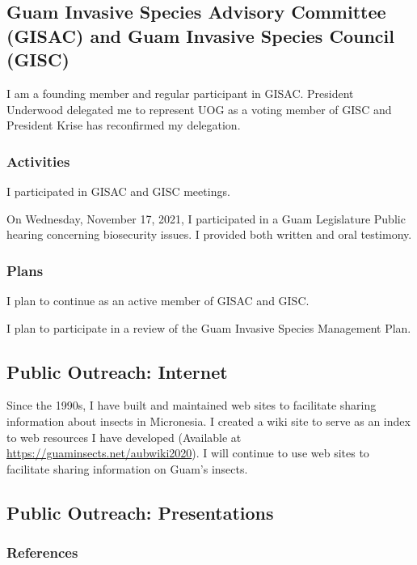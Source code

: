 \subsection{Guam Invasive Species Advisory Committee (GISAC) and Guam Invasive Species Council (GISC)}
	
I am a founding member and regular participant in GISAC. President Underwood delegated me to represent UOG as a voting member of GISC and President Krise has reconfirmed my delegation.

\subsubsection{Activities}

I participated in GISAC and GISC meetings.

On Wednesday, November 17, 2021, I participated in a Guam Legislature Public hearing concerning biosecurity issues. I provided both written and oral testimony.

\subsubsection{Plans}

I plan to continue as an active member of GISAC and GISC.

I plan to participate in a review of the Guam Invasive Species Management Plan.

\subsection{Public Outreach: Internet}

Since the 1990s, I have built and maintained web sites to facilitate sharing information about insects in Micronesia. I created a wiki site to serve as an index to web resources I have developed (Available at  \url{https://guaminsects.net/aubwiki2020}). I will continue to use web sites to facilitate sharing information on Guam's insects.

\subsection{Public Outreach: Presentations}
\begin{refsection}
\nocite{moore_biological_2021, moore_how_2021,moore_presentation_2021}
\nocite{grasela_preliminary_2022}
\nocite{moore_invasive_2022}
\subsubsection{References}
\printbibliography[heading=none]
\end{refsection}

